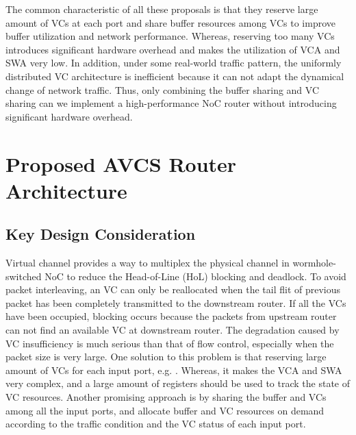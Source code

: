 \documentclass[10pt,conference]{IEEEtran}
\begin{document}
The common characteristic of all these proposals is that they reserve large amount of VCs at each port and share buffer resources among VCs to improve buffer utilization and network performance. Whereas, reserving too many VCs introduces significant hardware overhead and makes the utilization of VCA and SWA very low. In addition, under some real-world traffic pattern, the uniformly distributed VC architecture is inefficient because it can not adapt the dynamical change of network traffic. Thus, only combining the buffer sharing and VC sharing can we implement a high-performance NoC router without introducing significant hardware overhead.

\section{Proposed AVCS Router Architecture}\label{implemented}
\subsection{Key Design Consideration}
Virtual channel provides a way to multiplex the physical channel in wormhole-switched NoC to reduce the Head-of-Line (HoL) blocking and deadlock. To avoid packet interleaving, an VC can only be reallocated when the tail flit of previous packet has been completely transmitted to the downstream router. If all the VCs have been occupied, blocking occurs because the packets from upstream router can not find an available VC at downstream router. The degradation caused by VC insufficiency is much serious than that of flow control, especially when the packet size is very large. One solution to this problem is that reserving large amount of VCs for each input port, e.g. \cite{NPKV06}\cite{4555894}\cite{5770788}\cite{Neishaburi:2009:RAN:1531542.1531658}\cite{6310960}. Whereas, it makes the VCA and SWA very complex, and a large amount of registers should be used to track the state of VC resources. Another promising approach is by sharing the buffer and VCs among all the input ports, and allocate buffer and VC resources on demand according to the traffic condition and the VC status of each input port.
\end{document}
